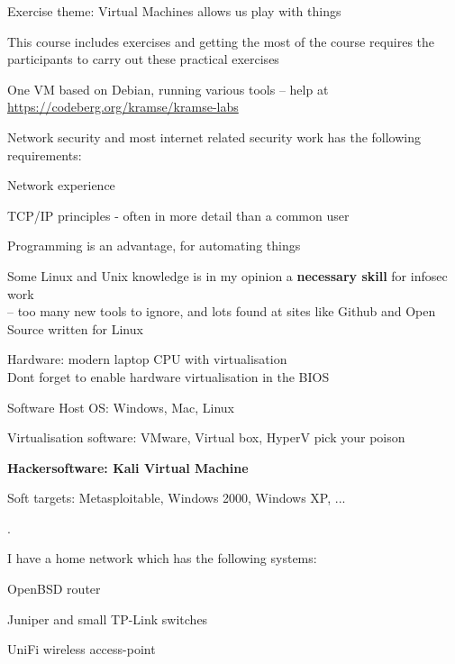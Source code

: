 \documentclass[Screen16to9,17pt]{foils}
\begin{document}

Exercise theme: Virtual Machines allows us play with things

\begin{list1}
\item This course includes exercises and getting the most of the course requires the participants to carry out these practical exercises
\item One VM based on Debian, running various tools -- help at \url{https://codeberg.org/kramse/kramse-labs}
\item Network security and most internet related security work has the following requirements:
\begin{list2}
\item Network experience
\item TCP/IP principles - often in more detail than a common user
\item Programming is an advantage, for automating things
\item Some Linux and Unix knowledge is in my opinion a {\bf necessary skill} for infosec work\\
-- too many new tools to ignore, and lots found at sites like Github and Open Source written for Linux
\end{list2}
\end{list1}



\begin{list2}
\item Hardware: modern laptop CPU with virtualisation\\
Dont forget to enable hardware virtualisation in the BIOS
\item Software Host OS: Windows, Mac, Linux
\item Virtualisation software: VMware, Virtual box, HyperV pick your poison
\item {\bf Hackersoftware: Kali Virtual Machine }
\item Soft targets: Metasploitable, Windows 2000, Windows XP, ...
\end{list2}

.

\begin{list1}
\item I have a home network which has the following systems:
\begin{list2}
\item OpenBSD router
\item Juniper and small TP-Link switches
\item UniFi wireless access-point
\end{list2}
\end{list1}
\end{document}

